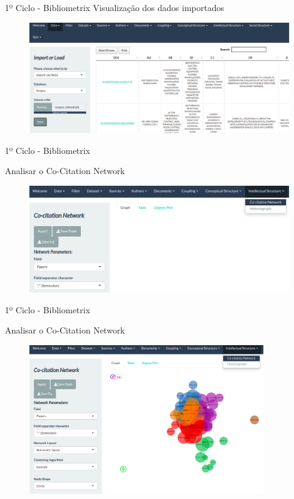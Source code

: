 \begin{frame}{1º Ciclo - Bibliometrix}
	Visualização dos dados importados
	\begin{figure}[hb]
		\includegraphics[width=1\textwidth]{figures/bibliometrix/b4.png}
	\end{figure}
\end{frame}

\begin{frame}{1º Ciclo - Bibliometrix}

	Analisar o Co-Citation Network
	\begin{figure}[hb]
		\includegraphics[width=1\textwidth]{figures/bibliometrix/b7.png}
	\end{figure}
\end{frame}

\begin{frame}{1º Ciclo - Bibliometrix}

	Analisar o Co-Citation Network
	\begin{figure}[hb]
		\includegraphics[width=0.9\textwidth]{figures/bibliometrix/b9.png}
	\end{figure}
\end{frame}

